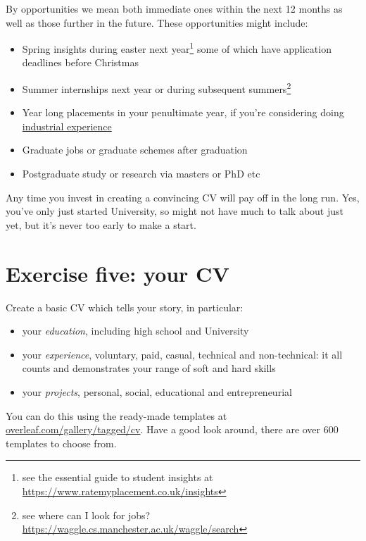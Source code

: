 \documentclass[
]{book}
\providecommand{\tightlist}{%
  \setlength{\itemsep}{0pt}\setlength{\parskip}{0pt}}
\begin{document}
By opportunities we mean both immediate ones within the next 12 months as well as those further in the future. These opportunities might include:

\begin{itemize}
\tightlist
\item
  Spring insights during easter next year\footnote{see the essential guide to student insights at \url{https://www.ratemyplacement.co.uk/insights}} some of which have application deadlines before Christmas
\item
  Summer internships next year or during subsequent summers\footnote{see where can I look for jobs? \url{https://waggle.cs.manchester.ac.uk/waggle/search}}
\item
  Year long placements in your penultimate year, if you're considering doing \href{http://studentnet.cs.manchester.ac.uk/employment/placement/}{industrial experience}
\item
  Graduate jobs or graduate schemes after graduation
\item
  Postgraduate study or research via masters or PhD etc
\end{itemize}

Any time you invest in creating a convincing CV will pay off in the long run. Yes, you've only just started University, so might not have much to talk about just yet, but it's never too early to make a start.

\hypertarget{ex5}{%
\section{Exercise five: your CV}\label{ex5}}

Create a basic CV which tells your story, in particular:

\begin{itemize}
\tightlist
\item
  your \emph{education}, including high school and University
\item
  your \emph{experience}, voluntary, paid, casual, technical and non-technical: it all counts and demonstrates your range of soft and hard skills
\item
  your \emph{projects}, personal, social, educational and entrepreneurial
\end{itemize}

You can do this using the ready-made templates at \href{https://www.overleaf.com/gallery/tagged/cv}{overleaf.com/gallery/tagged/cv}. Have a good look around, there are over 600 templates to choose from.
\end{document}
